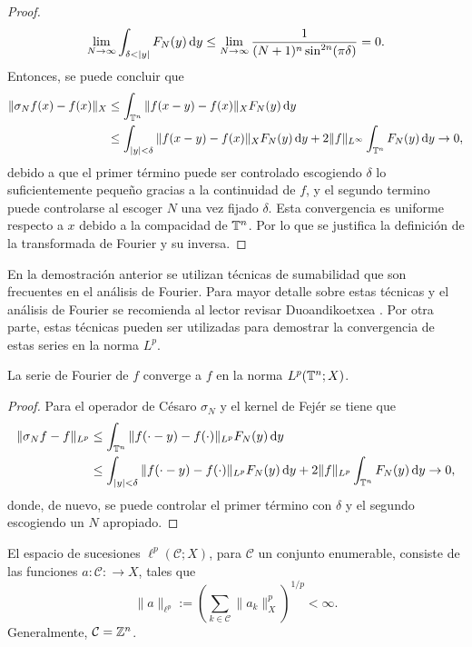 \begin{proof}
	 \begin{equation*}
	 	\lim_{N\to\infty}\int_{\delta<|y|} F_N(y) \diff y \leq \lim_{N\to\infty} \frac{1}{(N+1)^n\sin^{2n}(\pi \delta)} =0.
	 \end{equation*}
	 Entonces, se puede concluir que 
	 \begin{align*}
	 	\|\sigma_Nf(x) - f(x)\|_X & \leq \int_{\mathbb{T}^n} \|f(x-y) - f(x)\|_X F_N(y) \mathop{}\!\mathrm{d} y \\
	 	& \leq \int_{|y|<\delta} \|f(x-y) - f(x)\|_XF_N(y) \mathop{}\!\mathrm{d} y +2\|f\|_{L^\infty} \int_{\mathbb{T}^n} F_N(y) \mathop{}\!\mathrm{d} y \to 0,
	 \end{align*}
	 debido a que el primer término puede ser controlado escogiendo $\delta$ lo suficientemente pequeño gracias a la continuidad de $f$, y el segundo termino puede controlarse al escoger $N$ una vez fijado $\delta$. Esta convergencia es uniforme respecto a $x$ debido a la compacidad de $\mathbb{T}^n$. Por lo que se justifica la definición de la transformada de Fourier y su inversa.
\end{proof}
\begin{remark}
	En la demostración anterior se utilizan técnicas de sumabilidad que son frecuentes en el análisis de Fourier. Para mayor detalle sobre estas técnicas y el análisis de Fourier se recomienda al lector revisar Duoandikoetxea \cite{duoandikoetxea}. Por otra parte, estas técnicas pueden ser utilizadas para demostrar la convergencia de estas series en la norma $L^p$.
\end{remark}
\begin{theorem}
	La serie de Fourier de $f$ converge a $f$ en la norma $L^p(\mathbb{T}^n;X)$.
\end{theorem}
\begin{proof}
	Para el operador de Césaro $\sigma_N$ y el kernel de Fejér se tiene que 
	\begin{align*}
		\|\sigma_Nf -f\|_{L^p}  & \leq \int_{\mathbb{T}^n} \|f(\cdot-y) - f(\cdot)\|_{L^p} F_N(y) \mathop{}\!\mathrm{d} y \\
		& \leq \int_{|y|<\delta} \|f(\cdot-y) - f(\cdot)\|_{L^p}F_N(y) \mathop{}\!\mathrm{d} y +2\|f\|_{L^p} \int_{\mathbb{T}^n} F_N(y) \mathop{}\!\mathrm{d} y \to 0,
	\end{align*}
	donde, de nuevo, se puede controlar el primer término con $\delta$ y el segundo escogiendo un $N$ apropiado. 
\end{proof}
\begin{definition}
	El espacio de sucesiones $\ell^p(\mathcal{C};X)$, para $\mathcal{C}$ un conjunto enumerable, consiste de las funciones $a:\mathcal{C}:\to X$, tales que 
	\begin{equation*}
		\|a\|_{\ell^p} := \left( \sum_{k\in\mathcal{C}}\|a_k\|_X^p \right)^{1/p} <\infty.
	\end{equation*}
	Generalmente, $\mathcal{C}=\mathbb{Z}^n$.
\end{definition}
